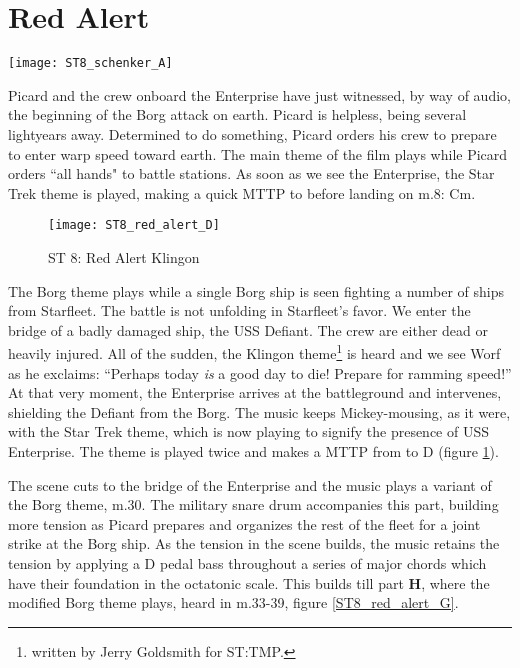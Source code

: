 \section{Red Alert}
\begin{figure*}[h!]
\center
\texttt{[image: ST8\_schenker\_A]}
	\caption{ST 8: Red Alert A: Prolonged Aeolian Cadence.}
	\label{ST8_schenker_A}
\end{figure*}

\noindent Picard and the crew onboard the Enterprise have just witnessed, by way of audio, the beginning of the Borg attack on earth. Picard is helpless, being several lightyears away. Determined to do something, Picard orders his crew to prepare to enter warp speed toward earth. The main theme of the film plays while Picard orders ``all hands" to battle stations. As soon as we see the Enterprise, the Star Trek theme is played, making a quick \ac{MTTP} to \ciss before landing on m.8: Cm.

\begin{figure}[h!]
\center
\texttt{[image: ST8\_red\_alert\_D]}
	\caption{ST 8: Red Alert Klingon}
	\label{ST8_red_alert_D}
\end{figure}

The Borg theme plays while a single Borg ship is seen fighting a number of ships from Starfleet. The battle is not unfolding in Starfleet's favor. We enter the bridge of a badly damaged ship, the USS Defiant. The crew are either dead or heavily injured. All of the sudden, the Klingon theme\footnote{written by Jerry Goldsmith for \ac{ST:TMP}.} is heard and we see Worf as he exclaims: ``Perhaps today \textit{is} a good day to die! Prepare for ramming speed!'' At that very moment, the Enterprise arrives at the battleground and intervenes, shielding the Defiant from the Borg. The music keeps Mickey-mousing, as it were, with the Star Trek theme, which is now playing to signify the presence of USS Enterprise. The theme is played twice and makes a \acf{MTTP} from \aflat to D (figure \ref{ST8_red_alert_D}).

The scene cuts to the bridge of the Enterprise and the music plays a variant of the Borg theme, m.30. The military snare drum accompanies this part, building more tension as Picard prepares and organizes the rest of the fleet for a joint strike at the Borg ship.
As the tension in the scene builds, the music retains the tension by applying a D pedal bass throughout a series of major chords which have their foundation in the octatonic scale. This builds till part \textbf{H}, where the modified Borg theme plays, heard in m.33-39, figure \ref{ST8_red_alert_G}.

